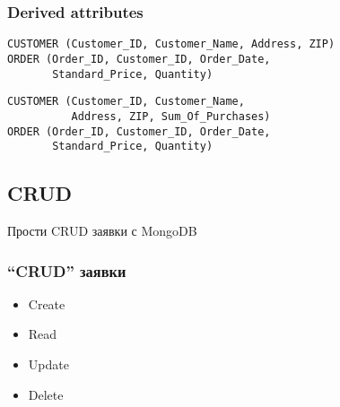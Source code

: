 \documentclass{beamer}
\begin{document}
\begin{frame}[fragile]
\frametitle{Derived attributes}

\begin{verbatim}
CUSTOMER (Customer_ID, Customer_Name, Address, ZIP)
ORDER (Order_ID, Customer_ID, Order_Date,
       Standard_Price, Quantity)
\end{verbatim}

\vspace{\baselineskip}

\begin{verbatim}
CUSTOMER (Customer_ID, Customer_Name,
          Address, ZIP, Sum_Of_Purchases)
ORDER (Order_ID, Customer_ID, Order_Date,
       Standard_Price, Quantity)
\end{verbatim}

\end{frame}

\subsection{CRUD}

\begin{frame}
\centerline{Прости CRUD заявки с MongoDB}
\end{frame}



\begin{frame}[fragile]
\frametitle{``CRUD'' заявки}


\begin{itemize}
  \item Create
  \item Read
  \item Update
  \item Delete
\end{itemize}

\end{frame}
\end{document}
